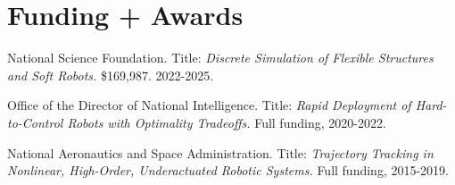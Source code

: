 \documentclass[letterpaper]{deedy-resume} %
\begin{document}
{{}
  
{}





\vspace{0.2cm}
\section{Funding + Awards}

\vspace{0.1cm}


\begin{etaremune}[itemsep=0.05cm]

\item {{} National Science Foundation. Title: {\it Discrete Simulation of Flexible Structures and Soft Robots.} \$169,987. 2022-2025.}

\item {{} Office of the Director of National Intelligence. Title: {\it Rapid Deployment of Hard-to-Control Robots with Optimality Tradeoffs.} Full funding, 2020-2022.}

\item {{} National Aeronautics and Space Administration. Title: {\it Trajectory Tracking in Nonlinear, High-Order, Underactuated Robotic Systems.} Full funding, 2015-2019.}
  

\end{etaremune}}
\end{document}
